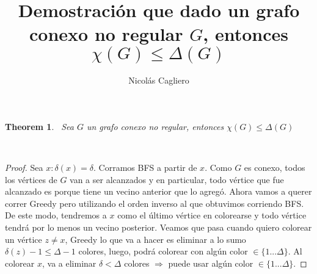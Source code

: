 \documentclass[11pt]{article}
\title{Demostración que dado un grafo conexo no regular $G$, entonces $\chi(G) \le \Delta(G)$}
\author{Nicolás Cagliero}
\newtheorem{theorem}{Theorem}
\begin{document}
\maketitle
\begin{theorem}\par
\
Sea $G$ un grafo conexo no regular, entonces $\chi(G) \le \Delta (G)$\par
\

\end{theorem}

\begin{proof}
Sea $x: \delta (x) = \delta$. Corramos BFS a partir de $x$. Como $G$ es conexo, todos los vértices de $G$ van a ser alcanzados y en particular, todo vértice que fue alcanzado es porque tiene un vecino anterior que lo agregó. Ahora vamos a querer correr Greedy pero utilizando el orden inverso al que obtuvimos corriendo BFS. De este modo, tendremos a $x$ como el último vértice en colorearse y todo vértice tendrá por lo menos un vecino posterior. Veamos que pasa cuando quiero colorear un vértice $z \ne x$, Greedy lo que va a hacer es eliminar a lo sumo $\delta(z) - 1 \le \Delta - 1$ colores, luego, podrá colorear con algún color $ \in \{1 ... \Delta\}$. Al colorear $x$, va a eliminar $\delta < \Delta$ colores $\Rightarrow$ puede usar algún color $ \in \{1 ... \Delta\}$.

\end{proof}
\end{document}
